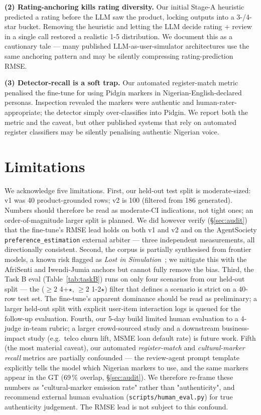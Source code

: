 \documentclass[sigconf,nonacm,balance]{acmart}
\begin{document}
\textbf{(2) Rating-anchoring kills rating diversity.} Our initial Stage-A
heuristic predicted a rating before the LLM saw the product, locking
outputs into a 3-/4-star bucket. Removing the heuristic and letting the
LLM decide rating + review in a single call restored a realistic
1-5 distribution. We document this as a cautionary tale --- many published
LLM-as-user-simulator architectures use the same anchoring pattern and
may be silently compressing rating-prediction RMSE.

\textbf{(3) Detector-recall is a soft trap.} Our automated register-match
metric penalised the fine-tune for using Pidgin markers in
Nigerian-English-declared personas. Inspection revealed the markers were
authentic and human-rater-appropriate; the detector simply over-classifies
into Pidgin. We report both the metric and the caveat, but other published
systems that rely on automated register classifiers may be silently
penalising authentic Nigerian voice.

\section{Limitations}
\label{sec:limitations}

We acknowledge five limitations. First, our held-out test split is
moderate-sized: v1 was 40 product-grounded rows; v2 is 100 (filtered
from 186 generated). Numbers should therefore be read as moderate-CI
indications, not tight ones; an order-of-magnitude larger split is
planned. We did however verify (§\ref{sec:audit}) that the fine-tune's
RMSE lead holds on both v1 and v2 and on the AgentSociety
\texttt{preference\_estimation} external arbiter --- three independent
measurements, all directionally consistent.
Second, the corpus is partially synthesised from frontier models, a known
risk flagged as \emph{Lost in Simulation}~\cite{lostinsimulation}; we
mitigate this with the AfriSenti and Iwendi-Jumia anchors but cannot
fully remove the bias. Third, the Task B eval (Table~\ref{tab:taskB}) runs on only four
scenarios from our held-out split --- the (\(\geq 2\) 4+\(\star\),
\(\geq 2\) 1-2\(\star\)) filter that defines a scenario is strict on a
40-row test set. The fine-tune's apparent dominance should be read as
preliminary; a larger held-out split with explicit user-item interaction
logs is queued for the follow-up evaluation. Fourth, our 5-day
build limited human evaluation to a 4-judge in-team rubric; a larger
crowd-sourced study and a downstream business-impact study (e.g.\ telco
churn lift, MSME loan default rate) is future work.
Fifth (the most material caveat), our automated \emph{register-match}
and \emph{cultural-marker recall} metrics are partially confounded ---
the review-agent prompt template explicitly tells the model which
Nigerian markers to use, and the same markers appear in the GT (69\,\%
overlap, §\ref{sec:audit}). We therefore re-frame these numbers as
"cultural-marker emission rate" rather than "authenticity", and
recommend external human evaluation (\texttt{scripts/human\_eval.py})
for true authenticity judgement. The RMSE lead is not subject to this
confound.
\end{document}
